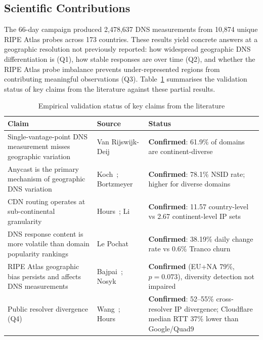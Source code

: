 \subsection{Scientific Contributions}
\label{subsec:5.3.1}

The 66-day campaign produced 2,478,637 \ac{DNS} measurements from 10,874 unique RIPE Atlas probes across 173 countries. These results yield concrete answers at a geographic resolution not previously reported: how widespread geographic \ac{DNS} differentiation is (Q1), how stable responses are over time (Q2), and whether the RIPE Atlas probe imbalance prevents under-represented regions from contributing meaningful observations (Q3). Table~\ref{tab:hypothesis_validation} summarises the validation status of key claims from the literature against these partial results.

\begin{table}[H]
\centering
\small
\begin{tabularx}{\linewidth}{X p{3.5cm} p{3.8cm}}
\toprule
\textbf{Claim} & \textbf{Source} & \textbf{Status} \\
\midrule
Single-vantage-point \ac{DNS} measurement misses geographic variation & Van Rijswijk-Deij~\cite{vanRijswijk2016} & \textbf{Confirmed}: 61.9\% of domains are continent-diverse \\
Anycast is the primary mechanism of geographic \ac{DNS} variation & Koch~\cite{Koch2021}; Bortzmeyer~\cite{Bortzmeyer2013} & \textbf{Confirmed}: 78.1\% \ac{NSID} rate; higher for diverse domains \\
\ac{CDN} routing operates at sub-continental granularity & Hours~\cite{Hours2016}; Li~\cite{Li2025} & \textbf{Confirmed}: 11.57 country-level vs 2.67 continent-level \ac{IP} sets \\
\ac{DNS} response content is more volatile than domain popularity rankings & Le Pochat~\cite{LePochat2019} & \textbf{Confirmed}: 38.19\% daily change rate vs 0.6\% Tranco churn \\
RIPE Atlas geographic bias persists and affects \ac{DNS} measurements & Bajpai~\cite{Bajpai2017}; Nosyk~\cite{Nosyk2025} & \textbf{Confirmed} (EU+NA 79\%, $p=0.073$), diversity detection not impaired \\
Public resolver divergence (Q4) & Wang~\cite{Wang2018}; Hours~\cite{Hours2016} & \textbf{Confirmed}: 52--55\% cross-resolver \ac{IP} divergence; Cloudflare median \ac{RTT} 37\% lower than Google/Quad9 \\
\bottomrule
\end{tabularx}
\caption{Empirical validation status of key claims from the literature}
\label{tab:hypothesis_validation}
\end{table}

